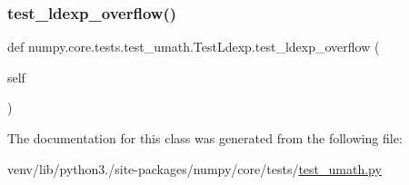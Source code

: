 \subsubsection{\texorpdfstring{test\+\_\+ldexp\+\_\+overflow()}{test\_ldexp\_overflow()}}
{\footnotesize\ttfamily def numpy.\+core.\+tests.\+test\+\_\+umath.\+Test\+Ldexp.\+test\+\_\+ldexp\+\_\+overflow (\begin{DoxyParamCaption}\item[{}]{self }\end{DoxyParamCaption})}



The documentation for this class was generated from the following file\+:\begin{DoxyCompactItemize}
\item 
venv/lib/python3./site-\/packages/numpy/core/tests/\hyperlink{test__umath_8py}{test\+\_\+umath.\+py}\end{DoxyCompactItemize}
